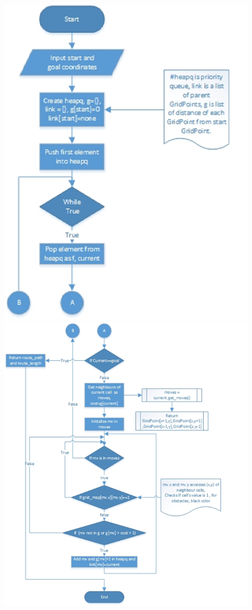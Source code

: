 \documentclass[report]{res}
\begin{document}
	\begin{center}
	\includegraphics[scale = 0.8]{graphics/movement_flow.png}\\
    \includegraphics[scale = 1.1]{graphics/movement_flow2.jpg}\\
	\end{center}
	
\end{document}
